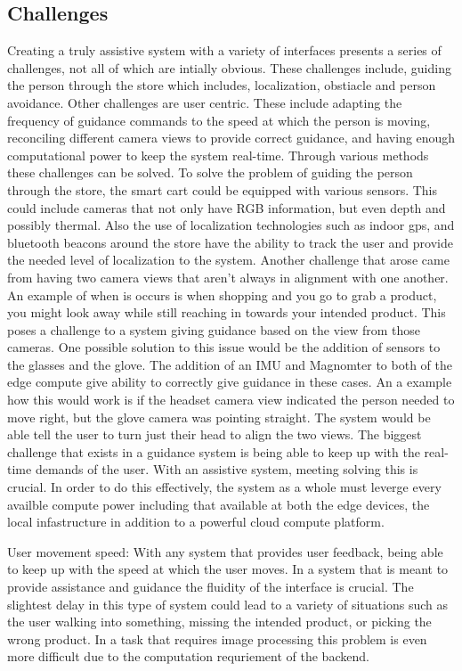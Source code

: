 \subsection{Challenges}
Creating a truly assistive system with a variety of interfaces presents a series 
of challenges, not all of which are intially obvious. These challenges include, guiding the person
through the store which includes, localization, obstiacle and person avoidance. Other challenges are
user centric. These include adapting the frequency of guidance commands to the speed at which the person is moving, 
reconciling different camera views to provide correct guidance, and having enough computational power to keep the system real-time. 
Through various methods these challenges can be solved. To solve the problem of guiding the person through the store, the smart cart could be equipped with various sensors. This could include cameras that not only have RGB information, but even depth and possibly thermal. Also the use of
localization technologies such as indoor gps, and bluetooth beacons around the store have the ability to track the user and provide the needed level of localization to the system.
Another challenge that arose came from having two camera views that aren't always in alignment with one another. An example of when is occurs is when shopping and you go to grab a product, you might look away while still reaching in towards your intended product. This poses a challenge to a system giving guidance based on the view from those cameras. One possible solution to this issue would be the addition of sensors to the glasses and the glove. The addition of an IMU and Magnomter to both of the edge compute give ability to correctly give guidance in these cases. An a example how this would work is if the headset camera view indicated the person needed to move right, but the glove camera was pointing straight. The system would be able tell the user to turn just their head to align the two views.
The biggest challenge that exists in a guidance system is being able to keep up with the real-time demands of the user. With an assistive system, meeting solving this is crucial. In order to do this effectively, the system as a whole must leverge every availble compute power including that available at both the edge devices, the local infastructure in addition to a powerful cloud compute platform.


User movement speed:
With any system that provides user feedback, being able to keep up with the speed at which the user moves. In a system that is meant to provide assistance and guidance the fluidity of the interface is crucial. The slightest delay in this type of system could lead to a variety of situations such as the user walking into something, missing the intended product, or picking the wrong product. In a task that requires image processing this problem is even more difficult due to the computation requriement of the backend.



